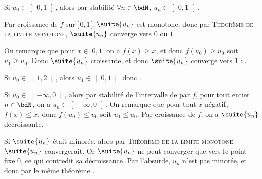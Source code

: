 \documentclass[a4paper,french,bookmarks]{article}
\begin{document}
\begin{example}{}{}
\begin{enumerate}
\begin{minipage}{0.35\linewidth}
        \end{minipage}
%
        \begin{minipage}{0.65\linewidth}
    \begin{enumerate}
        \itstar Si $u_0 \in \left]0, 1\right[$, alors par stabilité $\forall n \in \bdN$, $u_n \in \left]0, 1\right[$.
        
        Par croissance de $f$ sur $]0, 1[$, $\suite{u_n}$ est monotone, donc par \textsc{Théorème de la limite monotone}, $\suite{u_n}$ converge vers $0$ ou $1$.
        
        On remarque que pour $x \in ]0, 1[$ on a $f(x) \geq x$, et donc $f\left(u_0\right) \geq u_0$ soit $u_1 \geq u_0$. Donc $\suite{u_n}$ croissante, et donc $\suite{u_n}$ converge vers $1$ : .
        
        \itstar Si $u_0 \in \left]1, 2\right[$, alors $u_1 \in \left]0, 1\right[$ donc .
    \end{enumerate}
    \end{minipage}
    
        \begin{enumerate}
            \itstar Si $u_0 \in \left]-\infty, 0\right[$, alors par stabilité de l'intervalle de par $f$, pour tout entier $n \in \bdN$, on a $u_n \in \left]-\infty, 0\right[$. On remarque que pour tout $x$ négatif, $f(x) \leq x$, donc $f\left(u_0\right) \leq u_0$ soit $u_1 \leq u_0$. Par croissance de $f$, on a $\suite{u_n}$ décroissante.
            
            Si $\suite{u_n}$ était minorée, alors par \textsc{Théorème de la limite monotone} $\suite{u_n}$ convergerait. Or $\suite{u_n}$ ne peut converger que vers le point fixe $0$, ce qui contredit sa décroissance. Par l'absurde, $u_n$ n'est pas minorée, et donc par le même théorème .
            

\end{enumerate}
\end{enumerate}
\end{example}
\end{document}
